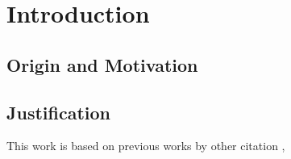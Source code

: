 \chapter{Introduction}

\section{Origin and Motivation}

\section{Justification}

This work is based on previous works by \cite{Schelling1971}
other citation \cite{Tissue2004}, \cite{Tissue2004}